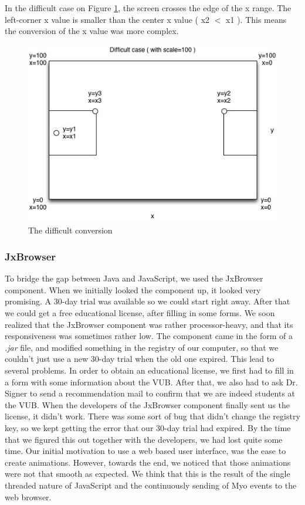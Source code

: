 \documentclass{article}
\begin{document}
In the difficult case on Figure \ref{diffconv}, the screen crosses the edge of the x range. The left-corner x value is smaller than the center x value ( x2 $<$ x1 ). This means the conversion of the x value was more complex.

\begin{figure}[!ht]
  \centering
      \centerline{\includegraphics[width=1\textwidth]{Images/diff-conversion.png}}
  \caption{The difficult conversion}
	\label{diffconv}
\end{figure}


\subsubsection{JxBrowser}
To bridge the gap between Java and JavaScript, we used the JxBrowser component. When we initially looked the component up, it looked very promising. A 30-day trial was available so we could start right away. After that we could get a free educational license, after filling in some forms. We soon realized that the JxBrowser component was rather processor-heavy, and that its responsiveness was sometimes rather low. The component came in the form of a \textit{.jar} file, and modified something in the registry of our computer, so that we couldn't just use a new 30-day trial when the old one expired. This lead to several problems. In order to obtain an educational license, we first had to fill in a form with some information about the VUB. After that, we also had to ask Dr. Signer to send a recommendation mail to confirm that we are indeed students at the VUB. When the developers of the JxBrowser component finally sent us the license, it didn't work. There was some sort of bug that didn't change the registry key, so we kept getting the error that our 30-day trial had expired. By the time that we figured this out together with the developers, we had lost quite some time.
Our initial motivation to use a web based user interface, was the ease to create animations. However, towards the end, we noticed that those animations were not that smooth as expected. We think that this is the result of the single threaded nature of JavaScript and the continuously sending of Myo events to the web browser.
\end{document}
